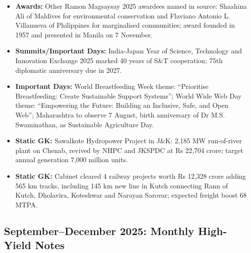 \documentclass[10pt,a4paper]{article}
\begin{document}
\begin{itemize}
    \item \textbf{Awards:} Other Ramon Magsaysay 2025 awardees named in source: Shaahina Ali of Maldives for environmental conservation and Flaviano Antonio L. Villanueva of Philippines for marginalised communities; award founded in 1957 and presented in Manila on 7 November.
    \item \textbf{Summits/Important Days:} India-Japan Year of Science, Technology and Innovation Exchange 2025 marked 40 years of S\&T cooperation; 75th diplomatic anniversary due in 2027.
    \item \textbf{Important Days:} World Breastfeeding Week theme: ``Prioritise Breastfeeding: Create Sustainable Support Systems''; World Wide Web Day theme: ``Empowering the Future: Building an Inclusive, Safe, and Open Web''; Maharashtra to observe 7 August, birth anniversary of Dr M.S. Swaminathan, as Sustainable Agriculture Day.
    \item \textbf{Static GK:} Sawalkote Hydropower Project in J\&K: 2,185 MW run-of-river plant on Chenab, revived by NHPC and JKSPDC at Rs 22,704 crore; target annual generation 7,000 million units.
    \item \textbf{Static GK:} Cabinet cleared 4 railway projects worth Rs 12,328 crore adding 565 km tracks, including 145 km new line in Kutch connecting Rann of Kutch, Dholavira, Koteshwar and Narayan Sarovar; expected freight boost 68 MTPA.
\end{itemize}

\subsection{September--December 2025: Monthly High-Yield Notes}
\end{document}
